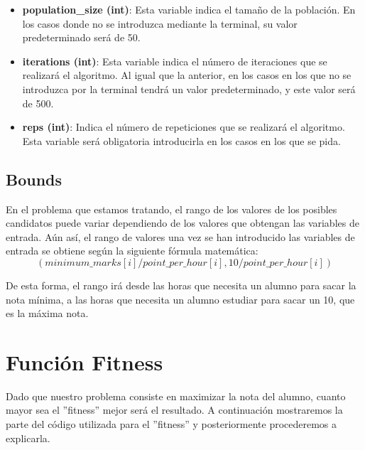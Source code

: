 \documentclass[11pt, a4paper, titlepage]{article}
\begin{document}
\begin{itemize}
\renewcommand{\labelitemi}{$\circ$}

\item \textbf{population\_size (int)}: Esta variable indica el tamaño de la población. En los casos donde no se introduzca mediante la terminal, su valor predeterminado será de 50.

\vspace{5mm}

\item \textbf{iterations (int)}: Esta variable indica el número de iteraciones que se realizará el algoritmo. Al igual que la anterior, en los casos en los que no se introduzca por la terminal tendrá un valor predeterminado, y este valor será de 500.

\vspace{5mm}

\item \textbf{reps (int)}: Indica el número de repeticiones que se realizará el algoritmo. Esta variable será obligatoria introducirla en los casos en los que se pida.

\end{itemize}

\subsection{Bounds}

En el problema que estamos tratando, el rango de los valores de los posibles candidatos puede variar dependiendo de los valores que obtengan las variables de entrada. Aún así, el rango de valores una vez se han introducido las variables de entrada se obtiene según la siguiente fórmula matemática:
\[
(minimum\_marks[i] / point\_per\_hour[i], 10 / point\_per\_hour[i])
\]

De esta forma, el rango irá desde las horas que necesita un alumno para sacar la nota mínima, a las horas que necesita un alumno estudiar para sacar un 10, que es la máxima nota.


\section{Función Fitness}
Dado que nuestro problema consiste en maximizar la nota del alumno, cuanto mayor sea el ''fitness'' mejor será el resultado. A continuación mostraremos la parte del código utilizada para el ''fitness'' y posteriormente procederemos a explicarla.

\vspace{5mm}
\end{document}
